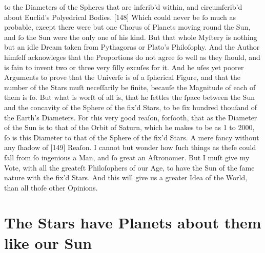 \documentclass[letterpaper]{book}
\begin{document}
to the Diameters of the Spheres that are inſcrib'd within, and circumſcrib'd
about Euclid's Polyedrical Bodies. [148] Which could never be ſo much as
probable, except there were but one Chorus of Planets moving round the
Sun, and ſo the Sun were the only one of his kind.
But that whole Myſtery is nothing but an idle Dream taken from Pythagoras or Plato's Philoſophy. And the Author himſelf acknowleges that the
Proportions do not agree ſo well as they ſhould, and is fain to invent two or
three very ſilly excuſes for it. And he uſes yet poorer Arguments to prove
that the Univerſe is of a ſpherical Figure, and that the number of the Stars
muſt neceſſarily be finite, becauſe the Magnitude of each of them is ſo.
But what is worſt of all is, that he ſettles the ſpace between the Sun and
the concavity of the Sphere of the fix'd Stars, to be ſix hundred thouſand
of the Earth's Diameters. For this very good reaſon, forſooth, that as the
Diameter of the Sun is to that of the Orbit of Saturn, which he makes to be
as 1 to 2000, ſo is this Diameter to that of the Sphere of the fix'd Stars. A
mere fancy without any ſhadow of [149] Reaſon. I cannot but wonder how
ſuch things as theſe could fall from ſo ingenious a Man, and ſo great an
Aſtronomer. But I muſt give my Vote, with all the greateſt Philoſophers of
our Age, to have the Sun of the ſame nature with the fix'd Stars. And this
will give us a greater Idea of the World, than all thoſe other Opinions.


\section{The Stars have Planets about them like our Sun}
\end{document}
